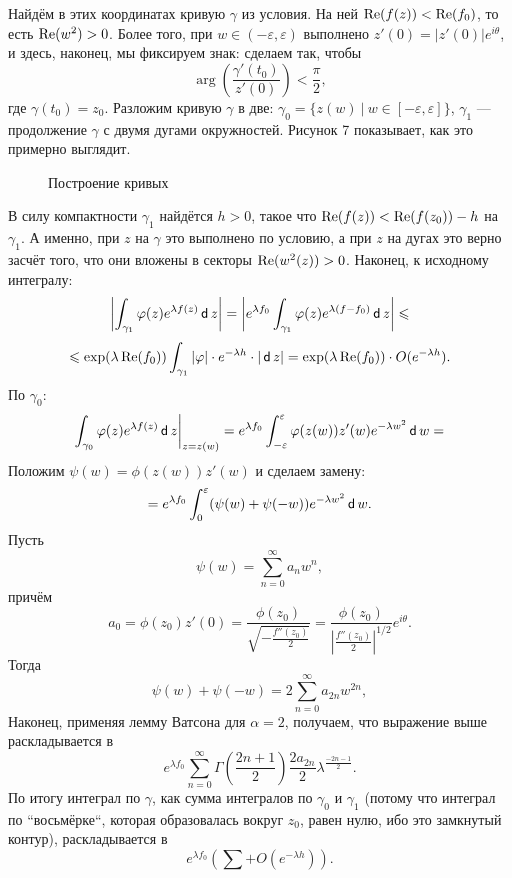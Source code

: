 Найдём в этих координатах кривую $\gamma$ из условия.
На ней $\operatorname{Re}(f(z)) < \operatorname{Re}(f_0)$, то есть $\operatorname{Re}(w^2) > 0$.
Более того, при $w \in (-\varepsilon, \varepsilon)$ выполнено $z'(0) = |z'(0)| e^{i\theta}$, и здесь, наконец, мы фиксируем знак: сделаем так, чтобы
\[
    \arg \left( \frac{\gamma'(t_0)}{z'(0)} \right) < \frac{\pi}{2},
\]
где $\gamma(t_0) = z_0$.
Разложим кривую $\gamma$ в две: $\gamma_0 = \{z(w)~|~ w \in [-\varepsilon, \varepsilon]\}$, $\gamma_1$ --- продолжение $\gamma$ с двумя дугами окружностей.
Рисунок 7 показывает, как это примерно выглядит.

\begin{figure}[ht]
    \centering
    \caption{Построение кривых}
\end{figure}

В силу компактности $\gamma_1$ найдётся $h > 0$, такое что $\operatorname{Re}(f(z)) < \operatorname{Re}(f(z_0)) - h$ на $\gamma_1$.
А именно, при $z$ на $\gamma$ это выполнено по условию, а при $z$ на дугах это верно засчёт того, что они вложены в секторы $\operatorname{Re}(w^2(z)) > 0$.
Наконец, к исходному интегралу:
\[
    \left| \int_{\gamma_1} \varphi(z) e^{\lambda f(z)} \operatorname{\mathsf d} z \right| = \left| e^{\lambda f_0} \int_{\gamma_1} \varphi(z) e^{\lambda(f - f_0)} \operatorname{\mathsf d} z \right| \leqslant
\]
\[
    \leqslant \exp(\lambda \operatorname{Re}(f_0)) \int_{\gamma_1} |\varphi| \cdot e^{-\lambda h}\cdot |\operatorname{\mathsf d} z| = \exp(\lambda \operatorname{Re}(f_0)) \cdot O(e^{-\lambda h}).
\]
По $\gamma_0$:
\[
    \int_{\gamma_0} \varphi(z) e^{\lambda f(z)} \operatorname{\mathsf d} z\bigg|_{z = z(w)} = e^{\lambda f_0} \int_{-\varepsilon}^{\varepsilon} \varphi(z(w)) z'(w) e^{-\lambda w^2} \operatorname{\mathsf d} w =
\]
Положим $\psi(w) = \phi(z(w)) z'(w)$ и сделаем замену:
\[
    = e^{\lambda f_0} \int_0^{\varepsilon} (\psi(w) + \psi(-w)) e^{-\lambda w^2} \operatorname{\mathsf d} w.
\]
Пусть
\[
    \psi(w) = \sum_{n=0}^{\infty} a_n w^n,
\]
причём 
\[
    a_0 = \phi(z_0) z'(0) = \frac{\phi(z_0)}{\sqrt{ -\frac{f''(z_0)}{2} }} = \frac{\phi(z_0)}{ \left| \frac{f''(z_0)}{2} \right|^{1/2}} e^{i\theta}.
\]
Тогда
\[
    \psi(w) + \psi(-w) = 2 \sum_{n=0}^{\infty} a_{2n} w^{2n},
\]
Наконец, применяя лемму Ватсона для $\alpha = 2$, получаем, что выражение выше раскладывается в
\[
    e^{\lambda f_0} \sum_{n=0}^{\infty} \Gamma \left( \frac{2n + 1}{2} \right) \frac{2a_{2n}}{2} \lambda^{\frac{-2n - 1}{2}}.
\]
По итогу интеграл по $\gamma$, как сумма интегралов по $\gamma_0$ и $\gamma_1$ (потому что интеграл по ``восьмёрке``, которая образовалась вокруг $z_0$, равен нулю, ибо это замкнутый контур), раскладывается в
\[
    e^{\lambda f_0} \left( \sum + O(e^{-\lambda h}) \right).
\]

